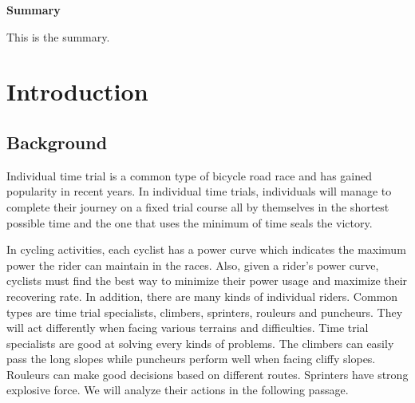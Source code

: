 \documentclass[14pt]{article}
\begin{document}
    \begin{center}
        \textbf{\large Summary}
    \end{center}

    This is the summary.


    \clearpage
    \newpage
    \pagestyle{empty}
    \setlength{\headheight}{12pt}
    \renewcommand{\headrulewidth}{0.5pt}
    \renewcommand{\footrulewidth}{0.0pt}
    \pagestyle{fancy}
    \cfoot{}
    \lfoot{}
    \rfoot{}

    \clearpage
    \thispagestyle{empty}
    \tableofcontents
    \newpage
    \pagestyle{fancy}
    \setcounter{page}{1}

	\newpage
	\section{Introduction}
	\subsection{Background}
	Individual time trial is a common type of bicycle road race and has gained popularity in recent years. In individual time trials, individuals will manage to complete their journey on a fixed trial course all by themselves in the shortest possible time and the one that uses the minimum of time seals the victory. 
	
	In cycling activities, each cyclist has a power curve which indicates the maximum power the rider can maintain in the races. Also, given a rider's power curve, cyclists must find the best way to minimize their power usage and maximize their recovering rate. In addition, there are many kinds of individual riders. Common types are time trial specialists, climbers, sprinters, rouleurs and puncheurs. They will act differently when facing various terrains and difficulties. Time trial specialists are good at solving every kinds of problems. The climbers can easily pass the long slopes while puncheurs perform well when facing cliffy slopes. Rouleurs can make good decisions based on different routes. Sprinters have strong explosive force. We will analyze their actions in the following passage.
	
\end{document}
